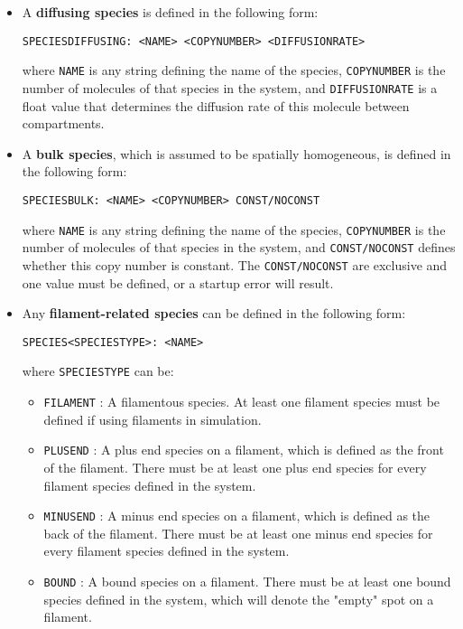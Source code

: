 \documentclass[11pt, oneside]{article}   	%
\begin{document}
\begin{itemize}
\item 
A \textbf{diffusing species} is defined in the following form:\newline\newline \centerline{\texttt{SPECIESDIFFUSING: <NAME> <COPYNUMBER> <DIFFUSIONRATE>}}\newline\newline where \texttt{NAME} is any string defining the name of the species, \texttt{COPYNUMBER} is the number of molecules of that species in the system, and \texttt{DIFFUSIONRATE} is a float value that determines the diffusion rate of this molecule between compartments.
\item
A \textbf{bulk species}, which is assumed to be spatially homogeneous, is defined in the following form:\newline\newline\centerline{\texttt{SPECIESBULK: <NAME> <COPYNUMBER> CONST/NOCONST}}\newline\newline where \texttt{NAME} is any string defining the name of the species, \texttt{COPYNUMBER} is the number of molecules of that species in the system, and \texttt{CONST/NOCONST} defines whether this copy number is constant. The \texttt{CONST/NOCONST} are exclusive and one value must be defined, or a startup error will result.
\item
Any \textbf{filament-related species} can be defined in the following form:\newline\newline\centerline{\texttt{SPECIES<SPECIESTYPE>: <NAME>}}\newline\newline where \texttt{SPECIESTYPE} can be:
\begin{itemize}
\item \texttt{FILAMENT} : A filamentous species. At least one filament species must be defined if using filaments in simulation.
\item \texttt{PLUSEND} : A plus end species on a filament, which is defined as the front of the filament. There must be at least one plus end species for every filament species defined in the system.
\item \texttt{MINUSEND} : A minus end species on a filament, which is defined as the back of the filament. There must be at least one minus end species for every filament species defined in the system.
\item \texttt{BOUND} : A bound species on a filament. There must be at least one bound species defined in the system, which will denote the "empty" spot on a filament.

\end{itemize}
\end{itemize}
\end{document}
